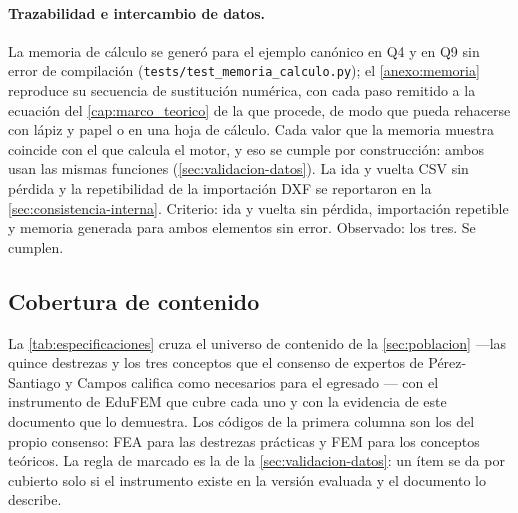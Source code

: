 \paragraph{Trazabilidad e intercambio de datos.} La memoria de cálculo se generó para el ejemplo canónico en Q4 y en Q9 sin error de compilación (\texttt{tests/test\_memoria\_calculo.py}); el \autoref{anexo:memoria} reproduce su secuencia de sustitución numérica, con cada paso remitido a la ecuación del \autoref{cap:marco_teorico} de la que procede, de modo que pueda rehacerse con lápiz y papel o en una hoja de cálculo. Cada valor que la memoria muestra coincide con el que calcula el motor, y eso se cumple por construcción: ambos usan las mismas funciones (\autoref{sec:validacion-datos}). La ida y vuelta CSV sin pérdida y la repetibilidad de la importación DXF se reportaron en la \autoref{sec:consistencia-interna}. Criterio: ida y vuelta sin pérdida, importación repetible y memoria generada para ambos elementos sin error. Observado: los tres. Se cumplen.

\subsection{Cobertura de contenido}
\label{sec:contenido-didactico}

La \autoref{tab:especificaciones} cruza el universo de contenido de la \autoref{sec:poblacion} —las quince destrezas y los tres conceptos que el consenso de expertos de Pérez-Santiago y Campos califica como necesarios para el egresado \autocite[pp.~1162-1163]{perezsantiago2023fem}— con el instrumento de EduFEM que cubre cada uno y con la evidencia de este documento que lo demuestra. Los códigos de la primera columna son los del propio consenso: FEA para las destrezas prácticas y FEM para los conceptos teóricos. La regla de marcado es la de la \autoref{sec:validacion-datos}: un ítem se da por cubierto solo si el instrumento existe en la versión evaluada y el documento lo describe.

